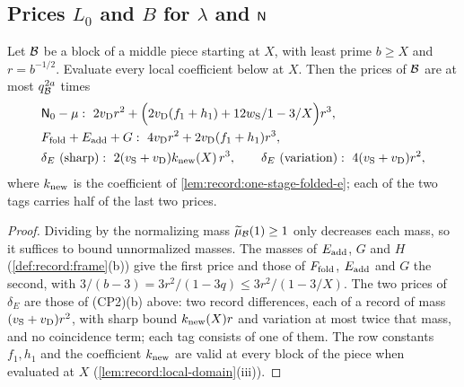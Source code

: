\subsection{Prices \texorpdfstring{$L_0$}{L\_0} and \texorpdfstring{$B$}{B} for \texorpdfstring{$\lambda$}{lambda} and \texorpdfstring{$\mathsf N$}{N}}
\label{subsec:middle-frame-prices}

\begin{lemma}\label{lem:record:middle-prices}
Let $\mathcal B$ be a block of a middle piece starting at $X$, with least prime
$b\ge X$ and $r=b^{-1/2}$. Evaluate every local coefficient below at $X$.
Then the prices of $\mathcal B$ are at most $q_{\mathcal B}^{2a}$ times
\begin{align*}
 &\mathsf N_0-\mu:\ 2v_{\rm D}r^2+\Bigl(2v_{\rm D}(f_1+h_1)+12w_{\rm S}/1-3/X\Bigr)r^3,\\
 &F_{\rm fold}+E_{\rm add}+G:\ 4v_{\rm D}r^2+2v_{\rm D}(f_1+h_1)r^3,\\
 &\delta_E\ \text{(sharp)}:\ 2(v_{\rm S}+v_{\rm D})k_{\rm new}(X)\,r^3,\qquad
 \delta_E\ \text{(variation)}:\ 4(v_{\rm S}+v_{\rm D})r^2,
\end{align*}
where $k_{\rm new}$ is the coefficient of \cref{lem:record:one-stage-folded-e};
each of the two tags carries half of the last two prices.
\end{lemma}

\begin{proof}
Dividing by the normalizing mass $\widetilde\mu_{\mathcal B}(1)\ge1$ only decreases
each mass, so it suffices to bound unnormalized masses. The masses of
$E_{\rm add}$, $G$ and $H$ (\cref{def:record:frame}(b)) give the first price
and those of $F_{\rm fold}$, $E_{\rm add}$ and $G$ the second, with
$3/(b-3)=3r^2/(1-3q)\le3r^2/(1-3/X)$. The two prices of $\delta_E$ are those
of (CP2)(b) above: two record differences, each of a record of mass
$(v_{\rm S}+v_{\rm D})r^2$, with sharp bound $k_{\rm new}(X)r$ and variation
at most twice that mass, and no coincidence term; each tag consists of one of
them. The row constants $f_1,h_1$ and the coefficient $k_{\rm new}$ are valid
at every block of the piece when evaluated at $X$
(\cref{lem:record:local-domain}(iii)).
\end{proof}

